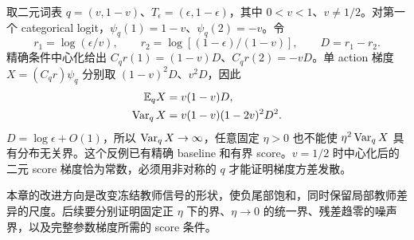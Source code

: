 取二元词表 $q=(v,1-v)$、$T_\epsilon=(\epsilon,1-\epsilon)$，其中 $0<v<1$、$v\ne1/2$。对第一个 categorical logit，$\psi_q(1)=1-v$、$\psi_q(2)=-v$。令
\begin{equation}
 r_1=\log(\epsilon/v),\qquad r_2=\log[(1-\epsilon)/(1-v)],\qquad D=r_1-r_2.
\end{equation}
精确条件中心化给出 $C_qr(1)=(1-v)D$、$C_qr(2)=-vD$。单 action 梯度 $X=(C_qr)\psi_q$ 分别取 $(1-v)^2D$、$v^2D$，因此
\begin{align}
 \mathbb E_qX&=v(1-v)D,\\
 \operatorname{Var}_qX&=v(1-v)(1-2v)^2D^2.
 \label{eq:proximal-binary-variance}
\end{align}
$D=\log\epsilon+O(1)$，所以 $\operatorname{Var}_qX\to\infty$，任意固定 $\eta>0$ 也不能使 $\eta^2\operatorname{Var}_qX$ 具有分布无关界。这个反例已有精确 baseline 和有界 score。$v=1/2$ 时中心化后的二元 score 梯度恰为常数，必须用非对称的 $q$ 才能证明梯度方差发散。

本章的改进方向是改变冻结教师信号的形状，使负尾部饱和，同时保留局部教师差异的尺度。后续要分别证明固定正 $\eta$ 下的界、$\eta\to0$ 的统一界、残差趋零的噪声界，以及完整参数梯度所需的 score 条件。
